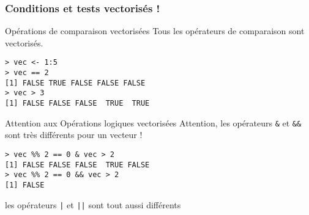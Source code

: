 \documentclass[10pt]{beamer}
\begin{document}
\begin{frame}[fragile]
  \frametitle{Conditions et tests vectorisés !}
  \begin{block}{Opérations de comparaison vectorisées}
    Tous les opérateurs de comparaison sont vectorisés.  
  \begin{lstlisting}
> vec <- 1:5
> vec == 2
[1] FALSE TRUE FALSE FALSE FALSE
> vec > 3
[1] FALSE FALSE FALSE  TRUE  TRUE
\end{lstlisting}
\end{block}

\begin{alertblock}{Attention aux Opérations logiques vectorisées}
  Attention, les opérateurs \texttt{\&} et \texttt{\&\&} sont très différents pour un vecteur !
 \begin{lstlisting}
> vec %% 2 == 0 & vec > 2
[1] FALSE FALSE FALSE  TRUE FALSE
> vec %% 2 == 0 && vec > 2
[1] FALSE    
\end{lstlisting}

les opérateurs \texttt{|} et \texttt{||} sont tout aussi différents
\end{alertblock}
\end{frame}
\end{document}
